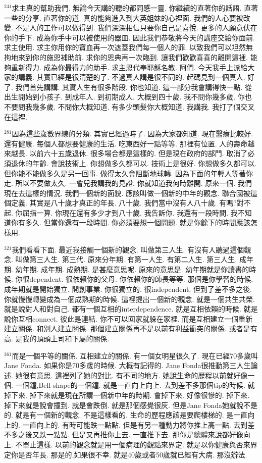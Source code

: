 \documentclass{book}
\begin{document}
$^{241}$求主真的幫助我們.
無論今天講的聽的都同感一靈.
你繼續的直著你的話語.
直著一些的分享.
直著你的道.
真的能夠進入到大英姐妹的心裡面.
我們的人心要被改變.
不是人的工作可以做得到.
我們深深相信只要你自己是喜悅.
更多的人願意伏在你的手下.
成為你手中可以被使用的器皿.
因此我們恭敬將今天的講座交給你面前.
求主使用.
求主你用你的寶血再一次遮蓋我們每一個人的罪.
以致我們可以坦然無拘地來到你的施恩補助前.
求你的恩典再一次臨到.
讓我們歡歡喜喜的離開這裡.
能夠重新得力.
成為你最得力的助手.
求主恩代奉耶穌名教.
阿們.
今天我手上派給大家的講義.
其實已經是很清楚的了.
不過真人講是很不同的.
起碼見到一個真人.
好了.
我們首先講講.
其實人生有很多階段.
你也知道.
這一部分我會講得快一點.
從出生開始到小孩子.
到成年人.
到初期成人.
大概到四十歲.
我不問你幾多歲.
你也不要問我幾多歲.
不問你大概知道.
有多少頭髮你大概知道.
我講我.
我打了個交叉在這裡.

$^{281}$因為這些歲數界線的分類.
其實已經過時了.
因為大家都知道.
現在醫療比較好.
還有健康.
每個人都想要健康的生活.
吃東西好一點等等.
那裡有位置.
人的壽命越來越長.
以前六十五歲退休.
很多場合都是這樣的.
但是現在政府的部門.
取消了必須退休的年齡.
會說技術上.
你想做多久都可以.
技術上是很好.
你想做多久都可以.
但你能不能做多久是另一回事.
做得太久會阻斷地球轉.
因為下面的年輕人等著你走.
所以不要做太久.
一會兒我講我的見證.
你就知道我何時離開.
原來一個.
我們現在去這樣的情況.
我們一個新的面貌.
應該叫做一個新的中年的觀念.
聯合國被這個定義.
其實是八十歲才真正的年長.
八十歲.
我們當中沒有人八十歲.
有嗎?對不起.
你屈指一算.
你現在還有多少才到八十歲.
我告訴你.
我還有一段時間.
我不知道你有多久.
但當你還有一段時間.
你必須要想一個問題.
就是你餘下的時間應該怎樣用.

$^{321}$我們看看下面.
最近我接觸一個新的觀念.
叫做第三人生.
有沒有人聽過這個觀念.
叫做第三人生.
第三代.
原來分年期.
有第一人生.
有第二人生.
第三人生.
成年期.
幼年期.
成年期.
成熟期.
是甚麼意思呢.
原來的意思是.
幼年期就是你讀書的時候.
你很dependent.
很依賴你的父母.
你依賴你的師長等等.
那個是你學習的時候.
成年期就是開始獨立.
開創事業.
你很獨立的.
很independent.
但到了差不多之後.
你就慢慢轉變成為一個成熟期的時候.
這裡提出一個新的觀念.
就是一個共生共榮.
就是說對人和對自己.
都有一個互相的interdependence.
就是互相依賴的時候.
就是說你互相connect.
彼此是連結.
你不可以回家就躲在家裡.
而是互相建立一個重新建立關係.
和別人建立關係.
那個建立關係再不是以前有利益衝突的關係.
或者是有高.
是我的頂頭上司和下屬的關係.

$^{361}$而是一個平等的關係.
互相建立的關係.
有一個女明星很久了.
現在已經70多歲叫Jane Fonda.
如果你是70多歲的時候.
大概有記得的.
Jane Fonda很推動第三人生論述.
她很有意思.
這裡列了她的對比.
有不同的地方.
她說生命的歷程以前就好像一個.
一個鐘,Bell shape的一個鐘.
就是一直向上向上.
去到差不多那個tip的時候.
就掉下來.
掉下來就是現在所謂一個新中年的時期.
會掉下來.
好像很慘的.
掉下來.
掉下來就是說會撞到.
就是會跌倒.
就是那個感覺很灰.
但是Jane Fonda她就說不是的.
就是有一個新的觀念.
不是這樣看的.
生命的歷程應該是要爬樓梯的.
是一直向上的.
一直向上的.
有時可能跌一點點.
但是有另一種動力將你推上高一點.
去到差不多之後又跌一點點.
但是又再推你上去.
一直推下去.
那你是總體來說都好像向上.
不單止這樣.
以前的觀念就是用一個病理的觀點來界定.
就是以你健康與否來界定你是否年長.
那是的,如果很不幸.
就是40歲或者50歲就已經有大病.
那沒辦法.
\end{document}
